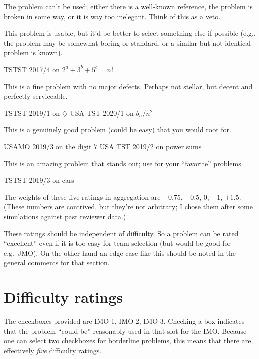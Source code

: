 \begin{description}
  \ii[Unsuitable] The problem can't be used;
  either there is a well-known reference,
  the problem is broken in some way,
  or it is way too inelegant.
  Think of this as a veto.

  \ii[Mediocre] This problem is usable,
  but it'd be better to select something else if possible
  (e.g., the problem may be somewhat boring or standard,
  or a similar but not identical problem is known).
  \begin{itemize}
    \ii TSTST 2017/4 on $2^a + 3^b + 5^c = n!$
  \end{itemize}

  \ii[Acceptable] This is a fine problem with no major defects.
  Perhaps not stellar, but decent and perfectly serviceable.
  \begin{itemize}
    \ii TSTST 2019/1 on $\diamondsuit$
    \ii USA TST 2020/1 on $b_n/n^2$
  \end{itemize}

  \ii[Nice] This is a genuinely good problem (could be easy)
  that you would root for.
  \begin{itemize}
    \ii USAMO 2019/3 on the digit $7$
    \ii USA TST 2019/2 on power sums
  \end{itemize}

  \ii[Excellent] This is an amazing problem that stands out;
  use for your ``favorite'' problems.
  \begin{itemize}
    \ii TSTST 2019/3 on cars
  \end{itemize}
\end{description}
The weights of these five ratings in aggregation
are $-0.75$, $-0.5$, $0$, $+1$, $+1.5$.
(These numbers are contrived, but they're not arbitrary;
I chose them after some simulations against past reviewer data.)

These ratings should be independent of difficulty.
So a problem can be rated ``excellent''
even if it is too easy for team selection
(but would be good for e.g.\ JMO).
On the other hand an edge case like this
should be noted in the general comments for that section.

\section{Difficulty ratings}
The checkboxes provided are IMO 1, IMO 2, IMO 3.
Checking a box indicates that the problem ``could be''
reasonably used in that slot for the IMO.
Because one can select two checkboxes for borderline problems,
this means that there are effectively \emph{five} difficulty ratings.

